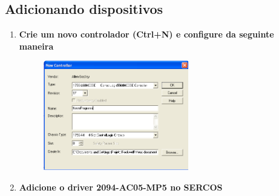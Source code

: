 \documentclass[a4paper,11pt]{scrartcl} %
\numberwithin{equation}{section} %
\numberwithin{figure}{section} %
\numberwithin{table}{section} %
\begin{document}
\subsection{Adicionando dispositivos}
\begin{enumerate}
	\item \textbf{Crie um novo controlador (Ctrl+N) e configure da seguinte maneira}
	\begin{figure}[!ht]
  \centering
    \includegraphics[width=0.6\textwidth]{figures/software/step01}
\end{figure}
	\item \textbf{Adicione o driver 2094-AC05-MP5 no SERCOS} 


\end{enumerate}
\end{document}

